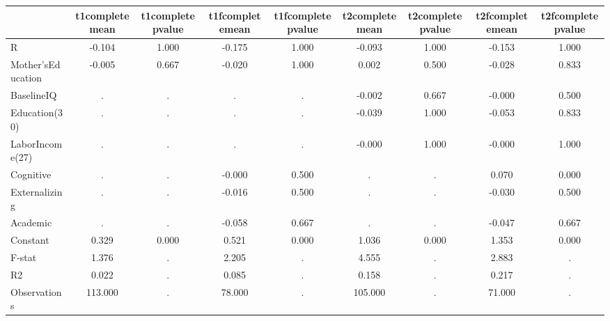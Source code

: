 \begin{table}[htbp]
\begin{tabular}{lcccccccc} \hline \hline
 & t1completemean  & t1completepvalue  & t1fcompletemean  & t1fcompletepvalue  & t2completemean  & t2completepvalue  & t2fcompletemean  & t2fcompletepvalue  \\  \hline 
R &    -0.104 &     1.000 &    -0.175 &     1.000 &    -0.093 &     1.000 &    -0.153 &     1.000 \\  
Mother'sEducation &    -0.005 &     0.667 &    -0.020 &     1.000 &     0.002 &     0.500 &    -0.028 &     0.833 \\  
BaselineIQ &         . &         . &         . &         . &    -0.002 &     0.667 &    -0.000 &     0.500 \\  
Education(30) &         . &         . &         . &         . &    -0.039 &     1.000 &    -0.053 &     0.833 \\  
LaborIncome(27) &         . &         . &         . &         . &    -0.000 &     1.000 &    -0.000 &     1.000 \\  
Cognitive &         . &         . &    -0.000 &     0.500 &         . &         . &     0.070 &     0.000 \\  
Externalizing &         . &         . &    -0.016 &     0.500 &         . &         . &    -0.030 &     0.500 \\  
Academic &         . &         . &    -0.058 &     0.667 &         . &         . &    -0.047 &     0.667 \\  
Constant &     0.329 &     0.000 &     0.521 &     0.000 &     1.036 &     0.000 &     1.353 &     0.000 \\  
F-stat &     1.376 &         . &     2.205 &         . &     4.555 &         . &     2.883 &         . \\  
R2 &     0.022 &         . &     0.085 &         . &     0.158 &         . &     0.217 &         . \\  
Observations &   113.000 &         . &    78.000 &         . &   105.000 &         . &    71.000 &         . \\  
\hline \hline \end{tabular}
\end{table}
